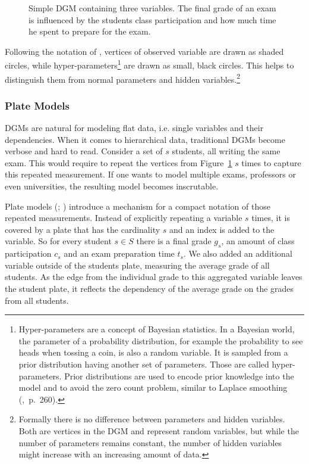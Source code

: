 \begin{figure}[t]
	\begin{center}
    	\scalebox{\tikzScale}{\adjustTikzSize }
	\end{center}
\caption[Simple directed graphical model containing three variables.]{Simple DGM containing three variables. The final grade of an exam is influenced by the students class participation and how much time he spent to prepare for the exam.}
		\label{fig:simple_dgm}
\end{figure}

Following the notation of \textcite{bishop2006pattern}, vertices of observed variable are drawn as shaded circles, while hyper-parameters\footnote{Hyper-parameters are a concept of Bayesian statistics. In a Bayesian world, the parameter of a probability distribution, for example the probability to see heads when tossing a coin, is also a random variable. It is sampled from a prior distribution having another set of parameters. Those are called hyper-parameters. Prior distributions are used to encode prior knowledge into the model and to avoid the zero count problem, similar to Laplace smoothing (\cite{manning2008introduction},~p.~260).} are drawn as small, black circles. This helps to distinguish them from normal parameters and hidden variables.\footnote{Formally there is no difference between parameters and hidden variables. Both are vertices in the DGM and represent random variables, but while the number of parameters remains constant, the number of hidden variables might increase with an increasing amount of data.}

\subsubsection{Plate Models}

DGMs are natural for modeling flat data, i.e. single variables and their dependencies. When it comes to hierarchical data, traditional DGMs become verbose and hard to read. Consider a set of $s$ students, all writing the same exam. This would require to repeat the vertices from Figure~\ref{fig:simple_dgm} $s$ times to capture this repeated measurement. If one wants to model multiple exams, professors or even universities, the resulting model becomes inscrutable.

Plate models (\cite{buntine1994operations}; \cite{gilks1994language}) introduce a mechanism for a compact notation of those repeated measurements. Instead of explicitly repeating a variable $s$ times, it is covered by a plate that has the cardinality $s$ and an index is added to the variable. So for every student $s \in S$ there is a final grade $g_s$, an amount of class participation $c_s$ and an exam preparation time $t_s$. We also added an additional variable outside of the students plate, measuring the average grade of all students. As the edge from the individual grade to this aggregated variable leaves the student plate, it reflects the dependency of the average grade on the grades from all students.

